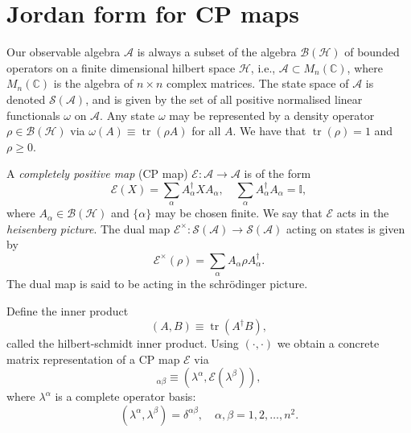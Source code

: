 \documentclass[prl,twocolumn,lengthcheck,superscriptaddress]{revtex4-1}
\newcommand{\tr}{\operatorname{tr}}
\theoremstyle{definition}
\theoremstyle{remark}
\begin{document}
\section{Jordan form for CP maps}

Our observable algebra $\mathcal{A}$ is always a subset of the algebra $\mathcal{B}(\mathcal{H})$ of bounded operators on a finite dimensional hilbert space $\mathcal{H}$, i.e., $\mathcal{A}\subset M_n(\mathbb{C})$, where $M_n(\mathbb{C})$ is the algebra of $n\times n$ complex matrices. The state space of $\mathcal{A}$ is denoted $\mathcal{S}(\mathcal{A})$, and is given by the set of all positive normalised linear functionals $\omega$ on $\mathcal{A}$.  Any state $\omega$ may be represented by a density operator $\rho \in \mathcal{B}(\mathcal{H})$ via $\omega(A) \equiv \tr(\rho A)$ for all $A$. We have that $\tr(\rho) = 1$ and $\rho \ge 0$. 

A \emph{completely positive map} (CP map) $\mathcal{E}:\mathcal{A}\rightarrow \mathcal{A}$ is of the form
\begin{equation}
	\mathcal{E}(X) = \sum_{\alpha} A_\alpha^\dag X A_\alpha, \quad \sum_{\alpha} A_\alpha^\dag A_\alpha = \mathbb{I},
\end{equation} 
where $A_\alpha \in \mathcal{B}(\mathcal{H})$ and $\{\alpha\}$ may be chosen finite. We say that $\mathcal{E}$ acts in the \emph{heisenberg picture}. The dual map $\mathcal{E}^\times : \mathcal{S}(\mathcal{A})\rightarrow \mathcal{S}(\mathcal{A})$ acting on states is given by
\begin{equation}
	\mathcal{E}^\times(\rho) = \sum_{\alpha} A_\alpha \rho A_{\alpha}^\dag.
\end{equation}
The dual map is said to be acting in the schr\"odinger picture.

Define the inner product 
\begin{equation}
	(A,B) \equiv \tr(A^\dag B),
\end{equation}
called the hilbert-schmidt inner product. Using $(\cdot, \cdot)$ we obtain a concrete matrix representation of a CP map $\mathcal{E}$ via 
\begin{equation}
	[\mathbb{E}]_{\alpha\beta} \equiv (\lambda^\alpha, \mathcal{E}(\lambda^\beta)),
\end{equation}
where $\lambda^\alpha$ is a complete operator basis:
\begin{equation}
	(\lambda^{\alpha}, \lambda^{\beta}) = \delta^{\alpha\beta}, \quad \alpha, \beta = 1,2, \ldots, n^2.
\end{equation}
\end{document}

